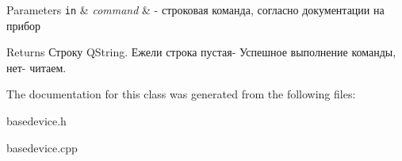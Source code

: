 \begin{DoxyParams}[1]{Parameters}
\mbox{\tt in}  & {\em command} & -\/ строковая команда, согласно документации на прибор \\
\hline
\end{DoxyParams}
\begin{DoxyReturn}{Returns}
Строку Q\+String. Ежели строка пустая-\/ Успешное выполнение команды, нет-\/ читаем. 
\end{DoxyReturn}


The documentation for this class was generated from the following files\+:\begin{DoxyCompactItemize}
\item 
basedevice.\+h\item 
basedevice.\+cpp\end{DoxyCompactItemize}
